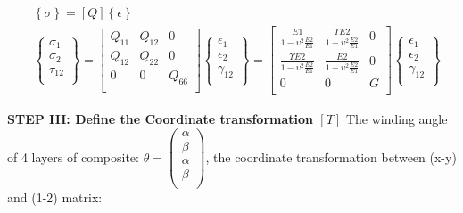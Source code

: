 \documentclass[12pt]{article}
\begin{document}
\begin{center}
	\begin{equation}
		\begin{align}
	&\left\{ \sigma \right\} = \left[Q \right] \left\{ \epsilon \right\} \\
&\left\{ \begin{matrix}
    \sigma_1  \\
    \sigma_2  \\
    \tau_{12}  \\
    \end{matrix} \right\} = \left[\begin{matrix}
		Q_{11} & Q_{12} & 0 \\
		Q_{12} & Q_{22} & 0 \\
		0 & 0 & Q_{66} \\
		\end{matrix} \right] \left\{ \begin{matrix}
			\epsilon_1  \\
			\epsilon_2  \\
			\gamma_{12}  \\
			\end{matrix} \right\} = \left[\begin{matrix}
				\frac{E1}{1-\upsilon^2\frac{E2}{E1}} & \frac{\Upsilon E2}{1-\upsilon^2\frac{E2}{E1}} & 0 \\
				\frac{\Upsilon E2}{1-\upsilon^2\frac{E2}{E1}} & \frac{E2}{1-\upsilon^2\frac{E2}{E1}} & 0 \\
				0 & 0 & G \\
				\end{matrix} \right] \left\{ \begin{matrix}
					\epsilon_1  \\
					\epsilon_2  \\
					\gamma_{12}  \\
					\end{matrix} \right\}
				\end{align}
				\end{equation}
			\end{center}\newline
\noindent \textbf{STEP III: Define the Coordinate transformation $\left[ T \right]$}\newline
\noindent The winding angle of 4 layers of composite: $ \theta = \left( \begin{matrix}
	\alpha  \\
	\beta  \\
	\alpha  \\
	\beta	\\
	\end{matrix} \right)$, the coordinate transformation between (x-y) and (1-2) matrix:
\end{document}
